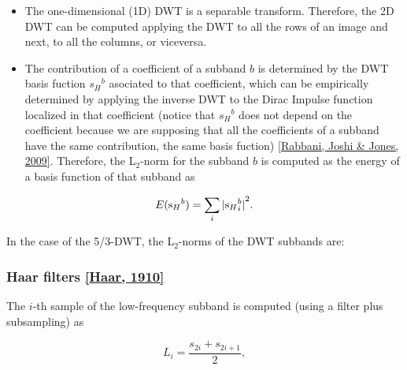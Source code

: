 \begin{itemize}
\tightlist
\item
  The one-dimensional (1D) DWT is a separable transform. Therefore, the
  2D DWT can be computed applying the DWT to all the rows of an image
  and next, to all the columns, or viceversa.
\end{itemize}

\begin{itemize}
\tightlist
\item
  The contribution of a coefficient of a subband \(b\) is determined by
  the DWT basis fuction \({s_H}^b\) asociated to that coefficient, which
  can be empirically determined by applying the inverse DWT to the Dirac
  Impulse function localized in that coefficient (notice that
  \({s_H}^b\) does not depend on the coefficient because we are
  supposing that all the coefficients of a subband have the same
  contribution, the same basis fuction)
  \href{https://scholar.google.es/scholar?hl=es\&as_sdt=0\%2C5\&q=Majid+Rabban\%2C+Rajan+L.+Joshi\%2C+and+Paul+W.+Jones.+The+JPEG+2000+Suite\%2C+chapter+JPEG+2000+Core+Coding+System+\%28Part+1\%29.+WILEY\%2C+2009\&btnG=}{{[}Rabbani,
  Joshi \& Jones, 2009{]}}. Therefore, the L\(_2\)-norm for the subband
  \(b\) is computed as the energy of a basis function of that subband as
\end{itemize}

\begin{equation}
  E({{\text s}_H}^b) = \sum_i{|{{\text s}_H}^b_i|}^2.
\end{equation}

In the case of the 5/3-DWT, the L\(_2\)-norms of the DWT subbands are:

    \hypertarget{haar-filters-haar-1910}{%
\subsubsection{\texorpdfstring{Haar filters
\href{https://scholar.google.es/scholar?hl=es\&as_sdt=0\%2C5\&q=A.+Haar.+Zur+Theorie+der+orthogolanen+Funktionen-Systeme.+Mathematische+Annalen\%2C+69\%3A331\%E2\%80\%93371\%2C+1910\&btnG=}{{[}Haar,
1910{]}}}{Haar filters {[}Haar, 1910{]}}}\label{haar-filters-haar-1910}}

The \(i\)-th sample of the low-frequency subband is computed (using a
filter plus subsampling) as

\begin{equation}
  L_i=\frac{s_{2i}+s_{2i+1}}{2},
  \tag{HaarL}
  \label{eq:Haar_A-LPF}
\end{equation}


